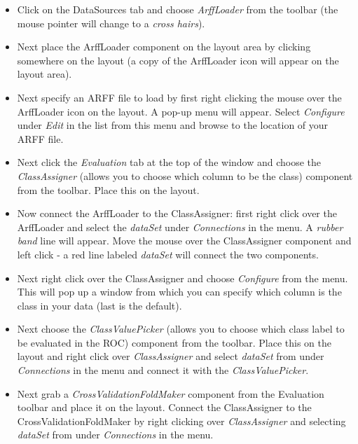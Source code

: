 \begin{itemize}
	\item Click on the DataSources tab and choose \textit{ArffLoader} from the
	toolbar (the mouse pointer will change to a \textit{cross hairs}).

	\item Next place the ArffLoader component on the layout area by clicking
	somewhere on the layout (a copy of the ArffLoader icon will appear on
	the layout area).

	\item Next specify an ARFF file to load by first right clicking the mouse
	over the ArffLoader icon on the layout. A pop-up menu will
	appear. Select \textit{Configure} under \textit{Edit} in the list from this menu and
	browse to the location of your ARFF file.

	\item Next click the \textit{Evaluation} tab at the top of the window and choose the
	\textit{ClassAssigner} (allows you to choose which column to be the class)
	component from the toolbar. Place this on the layout.

	\item Now connect the ArffLoader to the ClassAssigner: first right click
	over the ArffLoader and select the \textit{dataSet} under \textit{Connections} in
	the menu. A \textit{rubber band} line will appear. Move the mouse over the
	ClassAssigner component and left click - a red line labeled \textit{dataSet}
	will connect the two components.

	\item Next right click over the ClassAssigner and choose \textit{Configure} from
	the menu. This will pop up a window from which you can specify which
	column is the class in your data (last is the default).

	\item Next choose the \textit{ClassValuePicker} (allows you to choose which class 
	label to be evaluated in the ROC) component from the toolbar. Place this on the layout
	and right click over \textit{ClassAssigner} and select \textit{dataSet} from under
	\textit{Connections} in the menu and connect it with the \textit{ClassValuePicker}.

	\item Next grab a \textit{CrossValidationFoldMaker} component from the Evaluation
	toolbar and place it on the layout. Connect the ClassAssigner to the
	CrossValidationFoldMaker by right clicking over \textit{ClassAssigner} and
	selecting \textit{dataSet} from under \textit{Connections} in the menu.


\end{itemize}
